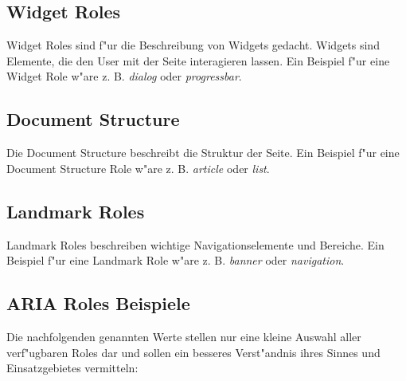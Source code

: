 \documentclass[a4paper,bibtotoc,oneside]{scrbook}
\begin{document}
\subsection{Widget Roles}
Widget Roles sind f"ur die Beschreibung von Widgets gedacht. Widgets sind Elemente, die den User mit der Seite interagieren lassen\cite[Abschnitt 5.4, widget]{aria_roles}. Ein Beispiel f"ur eine Widget Role w"are z. B. \emph{dialog} oder \emph{progressbar}.\cite[Abschnitt 5.3.2]{aria_roles}

\subsection{Document Structure}
Die Document Structure beschreibt die Struktur der Seite. Ein Beispiel f"ur eine Document Structure Role w"are z. B. \emph{article} oder \emph{list}.\cite[Abschnitt 5.3.3]{aria_roles}

\subsection{Landmark Roles}
Landmark Roles beschreiben wichtige Navigationselemente und Bereiche. Ein Beispiel f"ur eine Landmark Role w"are z. B. \emph{banner} oder \emph{navigation}.\cite[Abschnitt 5.3.4]{aria_roles}

\subsection{ARIA Roles Beispiele}
Die nachfolgenden genannten Werte stellen nur eine kleine Auswahl aller verf"ugbaren Roles dar und sollen ein besseres Verst"andnis ihres Sinnes und  Einsatzgebietes vermitteln:
\end{document}
